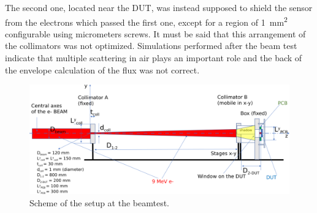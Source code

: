       The second one, located near the DUT, was instead supposed to shield the sensor from the electrons which passed the first one, except for a region of \SI{1}{mm\squared} configurable using micrometers screws. 
      It must be said that this arrangement of the collimators was not optimized. Simulations performed after the beam test indicate that multiple scattering in air plays an important role and the back of the envelope calculation of the flux was not correct.    
      \begin{figure}
         \centering
         \includegraphics[width=\linewidth]{figures/test_beam/Flash-beam-scheme.pdf}
         \caption{Scheme of the setup at the beamtest. }
         \label{fig:test_beam_scheme}
      \end{figure} 
